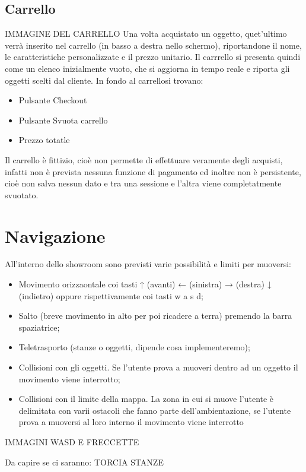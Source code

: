 \subsection{Carrello}
IMMAGINE DEL CARRELLO
Una volta acquistato un oggetto, quet'ultimo verrà inserito nel carrello (in basso a destra nello schermo), riportandone il nome, le caratteristiche personalizzate e il prezzo unitario.
Il carrrello si presenta quindi come un elenco inizialmente vuoto, che si aggiorna in tempo reale e riporta gli oggetti scelti dal cliente.
In fondo al carrellosi trovano:
\begin{itemize}
	\item Pulsante Checkout
	\item Pulsante Svuota carrello
	\item Prezzo totatle
\end{itemize}
Il carrello è fittizio, cioè non permette di effettuare veramente degli acquisti, infatti non è prevista nessuna funzione di pagamento ed inoltre non è persistente, cioè non salva nessun dato e tra una sessione e l'altra viene completatmente svuotato.

\pagebreak
\section{Navigazione}
All'interno dello showroom sono previsti varie possibilità e limiti per muoversi:
\begin{itemize}
	\item Movimento orizzaontale coi tasti ↑ (avanti) ← (sinistra) → (destra) ↓ (indietro) oppure rispettivamente coi tasti w a s d;
	\item Salto (breve movimento in alto per poi ricadere a terra) premendo la barra spaziatrice;
	\item Teletrasporto (stanze o oggetti, dipende cosa implementeremo);
	\item Collisioni con gli oggetti. Se l'utente prova a muoveri dentro ad un oggetto il movimento viene interrotto;
	\item Collisioni con il limite della mappa. La zona in cui si muove l'utente è delimitata con varii ostacoli che fanno parte dell'ambientazione, se l'utente prova a muoversi al loro interno il movimento viene interrotto
\end{itemize}
IMMAGINI WASD E FRECCETTE
\pagebreak



Da capire se ci saranno:
TORCIA
STANZE


